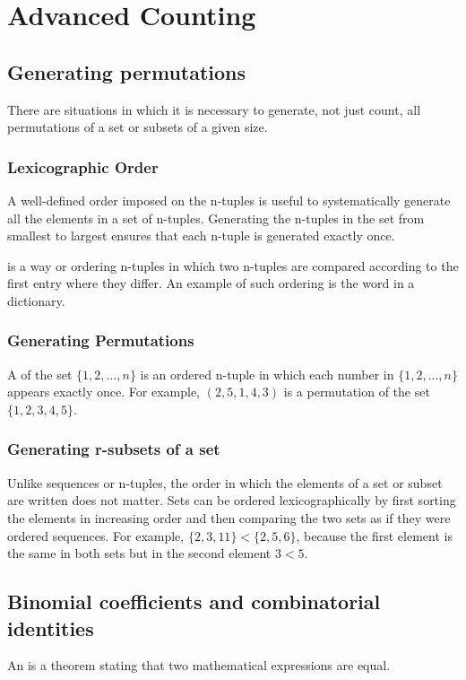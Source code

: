 \section{Advanced Counting}
\subsection{Generating permutations}
There are situations in which it is necessary to generate, not just count, all permutations of a set or subsets of a given size.

\subsubsection*{Lexicographic Order}
A well-defined order imposed on the n-tuples is useful to systematically generate all the elements in a set of n-tuples. Generating the n-tuples in the set from smallest to largest ensures that each n-tuple is generated exactly once.

 is a way or ordering n-tuples in which two n-tuples are compared according to the first entry where they differ. An example of such ordering is the word in a dictionary.

\subsubsection*{Generating Permutations}
A  of the set $\{1,2,\ldots,n\}$ is an ordered n-tuple in which each number in $\{1,2,\ldots,n\}$ appears exactly once. For example, $(2,5,1,4,3)$ is a permutation of the set $\{1,2,3,4,5\}$.

\subsubsection*{Generating r-subsets of a set}
Unlike sequences or n-tuples, the order in which the elements of a set or subset are written does not matter. Sets can be ordered lexicographically by first sorting the elements in increasing order and then comparing the two sets as if they were ordered sequences. For example, $\{2,3,11\} < \{2,5,6\}$, because the first element is the same in both sets but in the second element $3 < 5$.

\subsection{Binomial coefficients and combinatorial identities}
An  is a theorem stating that two mathematical expressions are equal.

